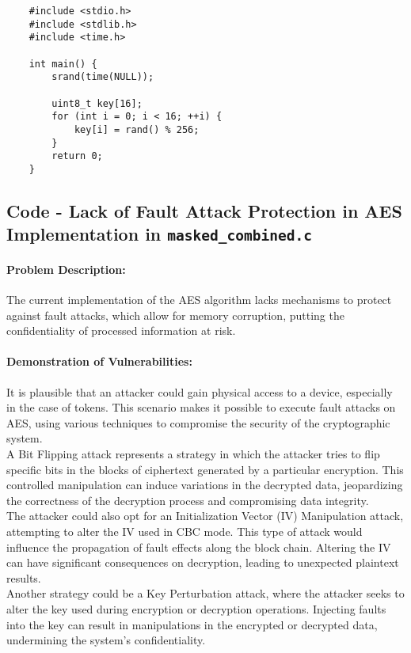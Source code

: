 \documentclass[12pt]{article}
\begin{document}
    \begin{verbatim}
    #include <stdio.h>
    #include <stdlib.h>
    #include <time.h>
    
    int main() {
        srand(time(NULL));
    
        uint8_t key[16];
        for (int i = 0; i < 16; ++i) {
            key[i] = rand() % 256;  
        }
        return 0;
    }
    \end{verbatim}

\subsection{Code - Lack of Fault Attack Protection in AES Implementation in \texttt{masked\_combined.c}}
    
    \paragraph{Problem Description:}
    The current implementation of the AES algorithm lacks mechanisms to protect against fault attacks, which allow for memory corruption, putting the confidentiality of processed information at risk.
    
    \paragraph{Demonstration of Vulnerabilities:}
    It is plausible that an attacker could gain physical access to a device, especially in the case of tokens. This scenario makes it possible to execute fault attacks on AES, using various techniques to compromise the security of the cryptographic system.
    \\
    A Bit Flipping attack represents a strategy in which the attacker tries to flip specific bits in the blocks of ciphertext generated by a particular encryption. This controlled manipulation can induce variations in the decrypted data, jeopardizing the correctness of the decryption process and compromising data integrity.
    \\
    The attacker could also opt for an Initialization Vector (IV) Manipulation attack, attempting to alter the IV used in CBC mode. This type of attack would influence the propagation of fault effects along the block chain. Altering the IV can have significant consequences on decryption, leading to unexpected plaintext results.
    \\
    Another strategy could be a Key Perturbation attack, where the attacker seeks to alter the key used during encryption or decryption operations. Injecting faults into the key can result in manipulations in the encrypted or decrypted data, undermining the system's confidentiality.
    
\end{document}
